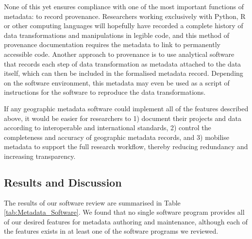 \documentclass{isprs} %
\begin{document}
None of this yet ensures compliance with one of the most important functions of metadata: to record provenance.
Researchers working exclusively with Python, R or other computing languages will hopefully have recorded a complete history of data transformations and manipulations in legible code, and this method of provenance documentation requires the metadata to link to permanently accessible code.
Another approach to provenance is to use analytical software that records each step of data transformation as metadata attached to the data itself, which can then be included in the formalised metadata record.
Depending on the software environment, this metadata may even be used as a script of instructions for the software to reproduce the data transformations.

If any geographic metadata software could implement all of the features described above, it would be easier for researchers to 1) document their projects and data according to interoperable and international standards, 2) control the completeness and accuracy of geographic metadata records, and 3) mobilise metadata to support the full research workflow, thereby reducing redundancy and increasing transparency.

\subsection{Results and Discussion}

The results of our software review are summarised in Table \ref{tab:Metadata_Software}.
We found that no single software program provides all of our desired features for metadata authoring and maintenance, although each of the features exists in at least one of the software programs we reviewed.
\end{document}
